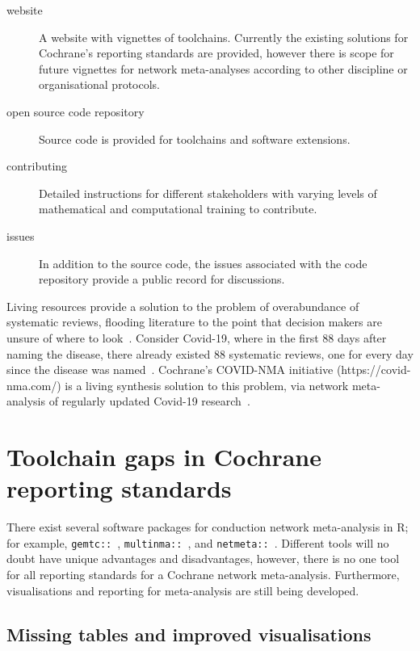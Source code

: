\documentclass[12pt]{article}\usepackage[]{graphicx}\usepackage[]{color}
\newcommand{\package}[1]{\texttt{{#1::}}}
\begin{document}
\begin{description}
\item[website] A website with vignettes of toolchains. Currently the existing solutions for Cochrane's reporting standards are provided, however there is scope for future vignettes for network meta-analyses according to other discipline or organisational protocols.
\item[open source code repository] Source code is provided for toolchains and software extensions.
\item[contributing] Detailed instructions for different stakeholders with varying levels of mathematical and computational training to contribute.
\item[issues] In addition to the source code, the issues associated with the code repository provide a public record for discussions.
\end{description}

Living resources provide a solution to the problem of overabundance of systematic reviews, flooding literature to the point that decision makers are unsure of where to look~\cite{gopalakrishnan_systematic_2013, moher_problem_2013, moller_are_2018, richards_too_2018}. Consider Covid-19, where in the first 88 days after naming the disease, there already existed 88 systematic reviews, one for every day since the disease was named~\cite{naumann_too_2021}. Cochrane's COVID-NMA initiative (https://covid-nma.com/) is a living synthesis solution to this problem, via network meta-analysis of regularly updated Covid-19 research~\cite{boutron_covid-nma_2020}.

\section{Toolchain gaps in Cochrane reporting standards}

There exist several software packages for conduction network meta-analysis in R; for example, \package{gemtc}~\cite{valkenhoef_gemtc_2020}, \package{multinma}~\cite{phillippo_multinma_2020}, and \package{netmeta}~\cite{rucker_netmeta_2021}. Different tools will no doubt have unique advantages and disadvantages, however, there is no one tool for all reporting standards for a Cochrane network meta-analysis. Furthermore, visualisations and reporting for meta-analysis are still being developed.

\subsection{Missing tables and improved visualisations}
\end{document}
